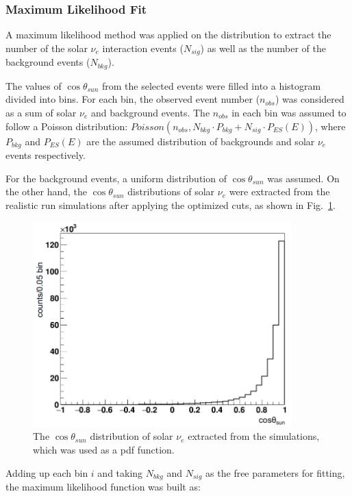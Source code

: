 \subsubsection{Maximum Likelihood Fit}\label{sect:poisson_fit}
A maximum likelihood method was applied on the distribution to extract the number of the solar $\nu_e$ interaction events ($N_{sig}$) as well as the number of the background events ($N_{bkg}$).

The values of $\cos\theta_{sun}$ from the selected events were filled into a histogram divided into bins.
For each bin, the observed event number ($n_{obs}$) was considered as a sum of solar $\nu_e$ and background events. The $n_{obs}$ in each bin was assumed to follow a Poisson distribution: $Poisson(n_{obs}, N_{bkg}\cdot P_{bkg}+N_{sig}\cdot P_{ES}(E))$, where $P_{bkg}$ and $P_{ES}(E)$ are the assumed distribution of backgrounds and solar $\nu_e$ events respectively.

For the background events, a uniform distribution of $\cos\theta_{sun}$ was assumed. On the other hand, the $\cos\theta_{sun}$ distributions of solar $\nu_e$ were extracted from the realistic run simulations after applying the optimized cuts, as shown in Fig.~\ref{solarPDF}. 

\begin{figure}[!htb]
	\centering
	\includegraphics[width=10cm]{solarPDF.png}
	\caption{The $\cos\theta_{sun}$ distribution of solar $\nu_e$ extracted from the simulations, which was used as a pdf function.}
	\label{solarPDF}
\end{figure}

Adding up each bin $i$ and taking $N_{bkg}$ and $N_{sig}$ as the free parameters for fitting, the maximum likelihood function was built as\cite{pdg2020}:

